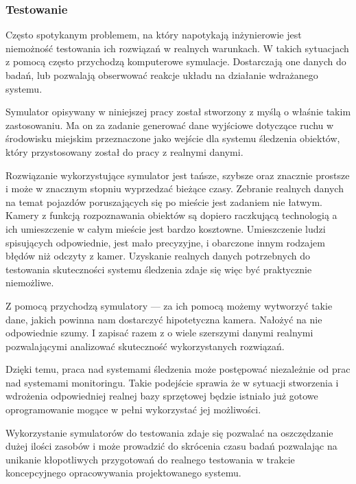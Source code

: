 \subsubsection{Testowanie}
\par{
Często spotykanym problemem, na który napotykają inżynierowie jest niemożność testowania ich rozwiązań w realnych warunkach. W takich sytuacjach z pomocą często przychodzą komputerowe symulacje. Dostarczają one danych do badań, lub pozwalają obserwować reakcje układu na działanie wdrażanego systemu.
}
\par{
Symulator opisywany w niniejszej pracy został stworzony z myślą o właśnie takim zastosowaniu. Ma on za zadanie generować dane wyjściowe dotyczące ruchu w środowisku miejskim przeznaczone jako wejście dla systemu śledzenia obiektów, który przystosowany został do pracy z realnymi danymi.
}
\par{
Rozwiązanie wykorzystujące symulator jest tańsze, szybsze oraz znacznie prostsze i może w znacznym stopniu wyprzedzać bieżące czasy.
Zebranie realnych danych na temat pojazdów poruszających się po mieście jest zadaniem nie łatwym. Kamery z funkcją rozpoznawania obiektów są dopiero raczkującą technologią a ich umieszczenie w całym mieście jest bardzo kosztowne. Umieszczenie ludzi spisujących odpowiednie, jest mało precyzyjne, i obarczone innym rodzajem błędów niż odczyty z kamer. Uzyskanie realnych danych potrzebnych do testowania skuteczności systemu śledzenia zdaje się więc być praktycznie niemożliwe.
}
\par{
Z pomocą przychodzą symulatory --- za ich pomocą możemy wytworzyć takie dane, jakich powinna nam dostarczyć hipotetyczna kamera. Nałożyć na nie odpowiednie szumy. I zapisać razem z o wiele szerszymi danymi realnymi pozwalającymi analizować skuteczność wykorzystanych rozwiązań.
}
\par{
Dzięki temu, praca nad systemami śledzenia może postępować niezależnie od prac nad systemami monitoringu. Takie podejście sprawia że w sytuacji stworzenia i wdrożenia odpowiedniej realnej bazy sprzętowej będzie istniało już gotowe oprogramowanie mogące w pełni wykorzystać jej możliwości.
}
\par{
Wykorzystanie symulatorów do testowania zdaje się pozwalać na oszczędzanie dużej ilości zasobów i może prowadzić do skrócenia czasu badań pozwalając na unikanie kłopotliwych przygotowań do realnego testowania w trakcie koncepcyjnego opracowywania projektowanego systemu.
}

